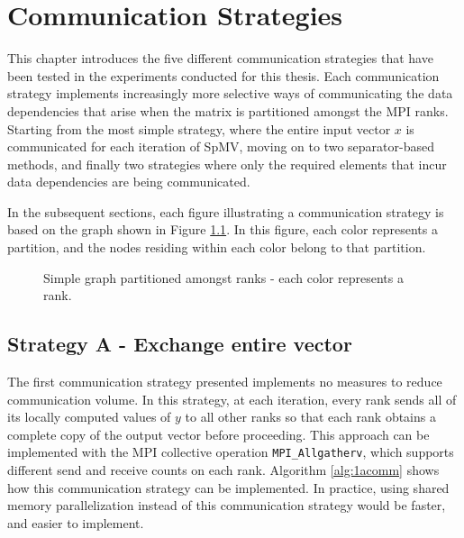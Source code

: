 \chapter{Communication Strategies}
\label{sec:commstrats}
This chapter introduces the five different communication strategies that have been tested in the experiments conducted for this thesis. Each communication strategy implements increasingly more selective ways of communicating the data dependencies that arise when the matrix is partitioned amongst the MPI ranks. Starting from the most simple strategy, where the entire input vector \(x\) is communicated for each iteration of SpMV, moving on to two separator-based methods, and finally two strategies where only the required elements that incur data dependencies are being communicated.  
\medskip

In the subsequent sections, each figure illustrating a communication strategy is based on the graph shown in Figure \ref{fig:examplegraph}. In this figure, each color represents a partition, and the nodes residing within each color belong to that partition.

\begin{figure}[H]
    \centering
    \caption{Simple graph partitioned amongst ranks - each color represents a rank.}
    \label{fig:examplegraph}
\end{figure}

\section{Strategy A - Exchange entire vector}
The first communication strategy presented implements no measures to reduce communication volume. In this strategy, at each iteration, every rank sends all of its locally computed values of \(y\) to all other ranks so that each rank obtains a complete copy of the output vector before proceeding. This approach can be implemented with the MPI collective operation \texttt{MPI\_Allgatherv}, which supports different send and receive counts on each rank. Algorithm \ref{alg:1acomm} shows how this communication strategy can be implemented. In practice, using shared memory parallelization instead of this communication strategy would be faster, and easier to implement. 
\medskip

\begin{algorithm}[H]
    \label{alg:1acomm}
    \caption{Strategy A - Communication Pattern}
    \SetAlgoVlined
\end{algorithm}
\medskip

